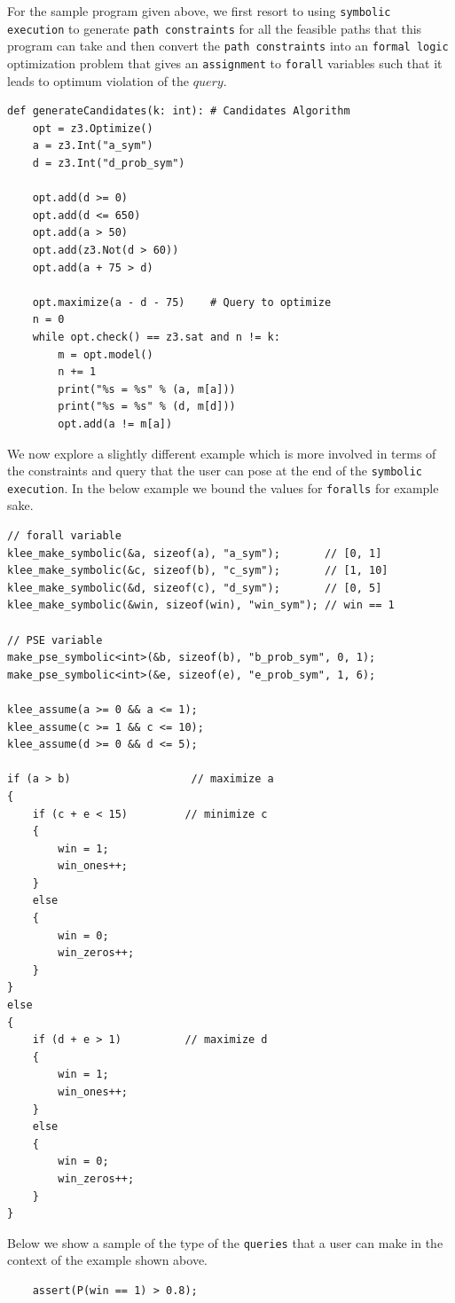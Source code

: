 \documentclass{article}
\begin{document}
For the sample program given above, we first resort to using \texttt{symbolic execution} to generate \texttt{path constraints} for all the feasible paths that this program can take and then convert the \texttt{path constraints} into an \texttt{formal logic} optimization problem that gives an \texttt{assignment} to \texttt{forall} variables such that it leads to optimum violation of the $query$.

\begin{verbatim}
def generateCandidates(k: int): # Candidates Algorithm
	opt = z3.Optimize()
	a = z3.Int("a_sym")
	d = z3.Int("d_prob_sym")
	
	opt.add(d >= 0)
	opt.add(d <= 650)
	opt.add(a > 50)
	opt.add(z3.Not(d > 60))
	opt.add(a + 75 > d)

	opt.maximize(a - d - 75) 	# Query to optimize
	n = 0
	while opt.check() == z3.sat and n != k:
		m = opt.model()
		n += 1
		print("%s = %s" % (a, m[a]))
		print("%s = %s" % (d, m[d]))
		opt.add(a != m[a])
\end{verbatim}

We now explore a slightly different example which is more involved in terms of the constraints and query that the user can pose at the end of the \texttt{symbolic execution}. In the below example we bound the values for \texttt{foralls} for example sake. 

\begin{verbatim}
// forall variable
klee_make_symbolic(&a, sizeof(a), "a_sym");       // [0, 1]
klee_make_symbolic(&c, sizeof(b), "c_sym");       // [1, 10]
klee_make_symbolic(&d, sizeof(c), "d_sym");       // [0, 5]
klee_make_symbolic(&win, sizeof(win), "win_sym"); // win == 1

// PSE variable
make_pse_symbolic<int>(&b, sizeof(b), "b_prob_sym", 0, 1);
make_pse_symbolic<int>(&e, sizeof(e), "e_prob_sym", 1, 6);

klee_assume(a >= 0 && a <= 1);
klee_assume(c >= 1 && c <= 10);
klee_assume(d >= 0 && d <= 5);

if (a > b)				     // maximize a
{
	if (c + e < 15)			// minimize c
	{
		win = 1;			
		win_ones++;
	}
	else
	{
		win = 0;
		win_zeros++;
	}
}
else
{
	if (d + e > 1)			// maximize d
	{
		win = 1;
		win_ones++;
	}
	else
	{
		win = 0;
		win_zeros++;
	}
}
\end{verbatim}

Below we show a sample of the type of the \texttt{queries} that a user can make in the context of the example shown above. 

\begin{verbatim}
	assert(P(win == 1) > 0.8);
\end{verbatim}
\end{document}
